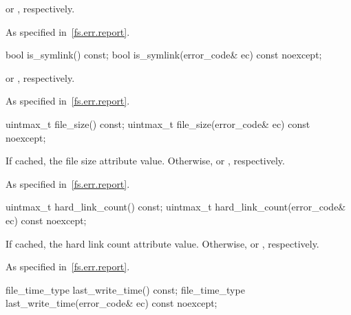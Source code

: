 \begin{itemdescr}
\pnum
\returns
{} or , respectively.

\pnum
\throws
As specified in~\ref{fs.err.report}.
\end{itemdescr}

%
\begin{itemdecl}
bool is_symlink() const;
bool is_symlink(error_code& ec) const noexcept;
\end{itemdecl}

\begin{itemdescr}
\pnum
\returns
{} or , respectively.

\pnum
\throws
As specified in~\ref{fs.err.report}.
\end{itemdescr}

%
\begin{itemdecl}
uintmax_t file_size() const;
uintmax_t file_size(error_code& ec) const noexcept;
\end{itemdecl}

\begin{itemdescr}
\pnum
\returns
If cached, the file size attribute value.
Otherwise,  or , respectively.

\pnum
\throws
As specified in~\ref{fs.err.report}.
\end{itemdescr}

%
\begin{itemdecl}
uintmax_t hard_link_count() const;
uintmax_t hard_link_count(error_code& ec) const noexcept;
\end{itemdecl}

\begin{itemdescr}
\pnum
\returns
If cached, the hard link count attribute value.
Otherwise,  or , respectively.

\pnum
\throws
As specified in~\ref{fs.err.report}.
\end{itemdescr}

%
\begin{itemdecl}
file_time_type last_write_time() const;
file_time_type last_write_time(error_code& ec) const noexcept;
\end{itemdecl}

